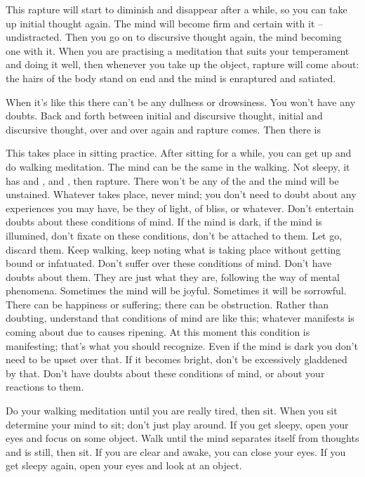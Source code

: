 This rapture will start to diminish and disappear after a while, so you can take up initial thought again. The mind will become firm and certain with it -- undistracted. Then you go on to discursive thought again, the mind becoming one with it. When you are practising a meditation that suits your temperament and doing it well, then whenever you take up the object, rapture will come about: the hairs of the body stand on end and the mind is enraptured and satiated. 

When it's like this there can't be any dullness or drowsiness. You won't have any doubts. Back and forth between initial and discursive thought, initial and discursive thought, over and over again and rapture comes. Then there is  

This takes place in sitting practice. After sitting for a while, you can get up and do walking meditation. The mind can be the same in the walking. Not sleepy, it has  and ,  and , then rapture. There won't be any of the  and the mind will be unstained. Whatever takes place, never mind; you don't need to doubt about any experiences you may have, be they of light, of bliss, or whatever. Don't entertain doubts about these conditions of mind. If the mind is dark, if the mind is illumined, don't fixate on these conditions, don't be attached to them. Let go, discard them. Keep walking, keep noting what is taking place without getting bound or infatuated. Don't suffer over these conditions of mind. Don't have doubts about them. They are just what they are, following the way of mental phenomena. Sometimes the mind will be joyful. Sometimes it will be sorrowful. There can be happiness or suffering; there can be obstruction. Rather than doubting, understand that conditions of mind are like this; whatever manifests is coming about due to causes ripening. At this moment this condition is manifesting; that's what you should recognize. Even if the mind is dark you don't need to be upset over that. If it becomes bright, don't be excessively gladdened by that. Don't have doubts about these conditions of mind, or about your reactions to them. 

Do your walking meditation until you are really tired, then sit. When you sit determine your mind to sit; don't just play around. If you get sleepy, open your eyes and focus on some object. Walk until the mind separates itself from thoughts and is still, then sit. If you are clear and awake, you can close your eyes. If you get sleepy again, open your eyes and look at an object. 

